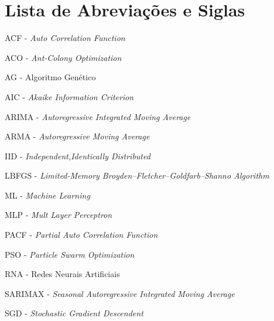 \chapter*{Lista de Abreviações e Siglas}
\linespread{1.5}

ACF - \textit{Auto Correlation Function}\bigskip

ACO - \textit{Ant-Colony Optimization}\bigskip

AG - Algoritmo Genético\bigskip

AIC - \textit{Akaike Information Criterion}\bigskip

ARIMA - \textit{Autoregressive Integrated Moving Average}\bigskip

ARMA - \textit{Autoregressive Moving Average}\bigskip

IID - \textit{Independent,Identically Distributed}\bigskip

LBFGS - \textit{Limited-Memory Broyden–Fletcher–Goldfarb–Shanno Algorithm}\bigskip

ML - \textit{Machine Learning}\bigskip

MLP - \textit{Mult Layer Perceptron}\bigskip

PACF - \textit{Partial Auto Correlation Function}\bigskip

PSO - \textit{Particle Swarm Optimization}\bigskip

RNA - Redes Neurais Artificiais\bigskip

SARIMAX - \textit{Seasonal Autoregressive Integrated Moving Average}\bigskip

SGD - \textit{Stochastic Gradient Descendent}\bigskip



